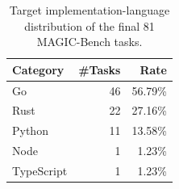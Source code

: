 \begin{table}[t]
\centering
\caption{Target implementation-language distribution of the final 81 MAGIC-Bench tasks.}
\label{tab:tab_dataset_target_languages}
\begin{tabular}{lrr}
\toprule
Category & \#Tasks & Rate \\
\midrule
Go & 46 & 56.79\% \\
Rust & 22 & 27.16\% \\
Python & 11 & 13.58\% \\
Node & 1 & 1.23\% \\
TypeScript & 1 & 1.23\% \\
\bottomrule
\end{tabular}
\end{table}
